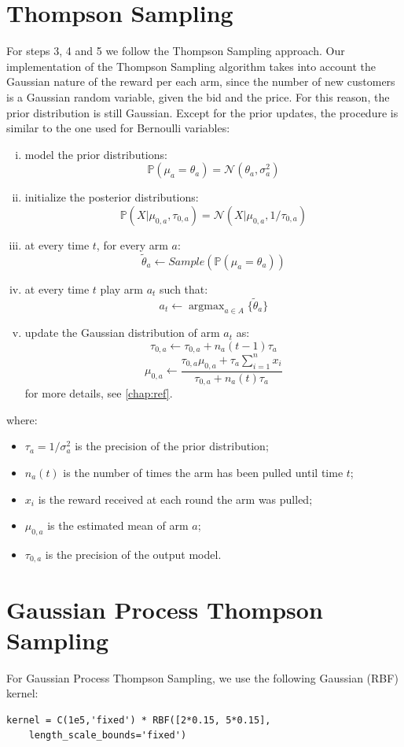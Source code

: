 \documentclass[12pt,a4paper]{report}
\DeclareMathOperator*{\argmax}{argmax}
\begin{document}
		\section{Thompson Sampling}
For steps 3, 4 and 5 we follow the Thompson Sampling approach.
Our implementation of the Thompson Sampling algorithm takes into account the Gaussian nature of the reward per each arm, since the number of new customers is a Gaussian random variable, given the bid and the price. For this reason, the prior distribution is still Gaussian. 
Except for the prior updates, the procedure is similar to the one used for Bernoulli variables:
\begin{enumerate}[i)]
	\item model the prior distributions: $$\mathbb{P}(\mu_a = \theta_a) = \mathcal{N}(\theta_a, \sigma^2_a)$$
	\item initialize the posterior distributions: $$\mathbb{P}(X|\mu_{0,a}, \tau_{0,a}) = \mathcal{N}(X|\mu_{0,a}, 1/\tau_{0,a}) $$
	\item at every time $t$, for every arm $a$:
\[ \tilde \theta_a \leftarrow Sample\left(\mathbb{P}(\mu_a = \theta_a)\right)\]
	\item at every time $t$ play arm $a_t$ such that:
		$$a_t \leftarrow \argmax_{a \in A} \{\tilde \theta_a\} $$
	\item update the Gaussian distribution of arm $a_t$ as:
		$$\tau_{0,a} \leftarrow \tau_{0,a} + n_a(t-1)\tau_a $$
		$$\mu_{0,a} \leftarrow \frac{\tau_{0,a}\mu_{0,a} + \tau_a \sum_{i=1}^{n}{x_i}}{\tau_{0,a} + n_a(t)\tau_a} $$
		for more details, see \autoref{chap:ref}.
\end{enumerate}
where:
\begin{itemize}
	\item $\tau_a = 1/\sigma^2_a$ is the precision of the prior distribution;
	\item $n_a(t)$ is the number of times the arm has been pulled until time $t$;
	\item $x_i$ is the reward received at each round the arm was pulled;
	\item $\mu_{0,a}$ is the estimated mean of arm $a$;
	\item $\tau_{0,a}$ is the precision of the output model.
\end{itemize}		

\section{Gaussian Process Thompson Sampling}
For Gaussian Process Thompson Sampling, we use the following Gaussian (RBF) kernel: 
 \begin{lstlisting}[mathescape=true]
kernel = C(1e5,'fixed') * RBF([2*0.15, 5*0.15],
	length_scale_bounds='fixed')
\end{lstlisting}
 
\end{document}
